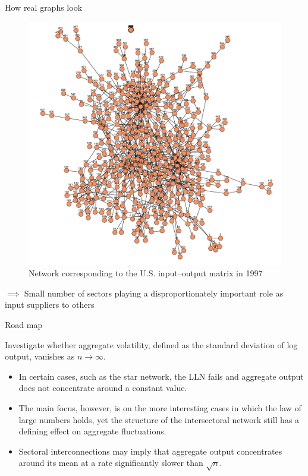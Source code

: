 \documentclass{beamer}
\begin{document}
\begin{frame}{How real graphs look}
    \justifying
    \begin{figure}[H]
        \caption*{Network corresponding to the U.S. input–output matrix in 1997}
        \includegraphics[scale=0.4]{3}
        \centering
      \end{figure}   

      $\implies$  Small number of sectors playing a disproportionately
      important role as input suppliers to others
\end{frame}

\begin{frame}{Road map}
    \justifying    

    Investigate whether aggregate volatility, defined as the standard deviation of log
    output, vanishes as $n\rightarrow\infty$.\\[10pt]
    \begin{itemize}
        \justifying    
        \item In certain cases, such as the star network,
        the LLN fails and aggregate output does not concentrate
        around a constant value.
        \item The main focus, however, is on the more interesting cases
        in which the law of large numbers holds, yet the structure of the intersectoral
        network still has a defining effect on aggregate fluctuations.
        \item  Sectoral interconnections may imply that aggregate output concentrates around its
        mean at a rate significantly slower than $\sqrt{n}$.
    \end{itemize} 

    \end{frame}
\end{document}
